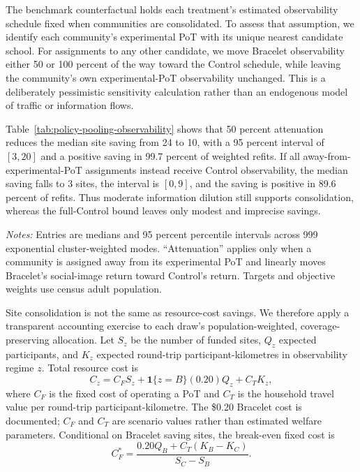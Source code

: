 \documentclass[12pt]{article}
\begin{document}
The benchmark counterfactual holds each treatment's estimated observability
schedule fixed when communities are consolidated. To assess that assumption,
we identify each community's experimental PoT with its unique nearest
candidate school. For assignments to any other candidate, we move Bracelet
observability either 50 or 100 percent of the way toward the Control schedule,
while leaving the community's own experimental-PoT observability unchanged.
This is a deliberately pessimistic sensitivity calculation rather than an
endogenous model of traffic or information flows.

Table~\ref{tab:policy-pooling-observability} shows that 50 percent attenuation
reduces the median site saving from 24 to 10, with a 95 percent interval of
$[3,20]$ and a positive saving in 99.7 percent of weighted refits. If all
away-from-experimental-PoT assignments instead receive Control observability,
the median saving falls to 3 sites, the interval is $[0,9]$, and the saving is
positive in 89.6 percent of refits. Thus moderate information dilution still
supports consolidation, whereas the full-Control bound leaves only modest and
imprecise savings.

\begin{table}[htbp]
  \centering
  \scriptsize
  \caption{Policy sensitivity to observability under site consolidation}
  \label{tab:policy-pooling-observability}
  \resizebox{\textwidth}{!}{%
  }
  \begin{minipage}{0.96\linewidth}
    \vspace{0.35em}\footnotesize
    \textit{Notes:} Entries are medians and 95 percent percentile intervals
    across 999 exponential cluster-weighted modes. ``Attenuation'' applies
    only when a community is assigned away from its experimental PoT and
    linearly moves Bracelet's social-image return toward Control's return.
    Targets and objective weights use census adult population.
  \end{minipage}
\end{table}

Site consolidation is not the same as resource-cost savings. We therefore
apply a transparent accounting exercise to each draw's population-weighted,
coverage-preserving allocation. Let $S_z$ be the number of funded sites,
$Q_z$ expected participants, and $K_z$ expected round-trip
participant-kilometres in observability regime $z$. Total resource cost is
\begin{equation}
  C_z=C_F S_z + \mathbf{1}\{z=B\}(0.20)Q_z + C_TK_z,
  \label{eq:policy-resource-cost}
\end{equation}
where $C_F$ is the fixed cost of operating a PoT and $C_T$ is the household
travel value per round-trip participant-kilometre. The \$0.20 Bracelet cost is
documented; $C_F$ and $C_T$ are scenario values rather than estimated welfare
parameters. Conditional on Bracelet saving sites, the break-even fixed cost is
\begin{equation}
  C_F^*=\frac{0.20Q_B+C_T(K_B-K_C)}{S_C-S_B}.
  \label{eq:policy-break-even}
\end{equation}
\end{document}
